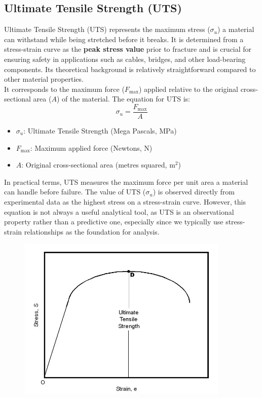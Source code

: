 \documentclass{article}
\begin{document}
{\subsection{Ultimate Tensile Strength (UTS)}
Ultimate Tensile Strength (UTS) represents the maximum stress ($\sigma_{u}$) a material can withstand while being stretched before it breaks. It is determined from a stress-strain curve as the \textbf{peak stress value} prior to fracture and is crucial for ensuring safety in applications such as cables, bridges, and other load-bearing components. Its theoretical background is relatively straightforward compared to other material properties.\\[8pt]
It corresponds to the maximum force ($F_{\text{max}}$) applied relative to the original cross-sectional area ($A$) of the material. The equation for UTS is:
\begin{equation}
    \sigma_{u} = \frac{F_{\text{max}}}{A}
\end{equation}
\begin{itemize}[itemsep=-1mm]
    \item $\sigma_{u}$: Ultimate Tensile Strength (Mega Pascals, MPa)
    \item $F_{\text{max}}$: Maximum applied force (Newtons, N)
    \item $A$: Original cross-sectional area (metres squared, $\text{m}^2$)
\end{itemize}
In practical terms, UTS measures the maximum force per unit area a material can handle before failure. The value of UTS ($\sigma_{u}$) is observed directly from experimental data as the highest stress on a stress-strain curve. However, this equation is not always a useful analytical tool, as UTS is an observational property rather than a predictive one, especially since we typically use stress-strain relationships as the foundation for analysis.
\begin{center}
    \begin{minipage}{0.42\textwidth}\centering
        \begin{figure}[H]
            \centering
            \includegraphics[width=0.9\textwidth]{images/ultimate-tensile-strength.png}

\end{figure}
\end{minipage}
\end{center}}
\end{document}
